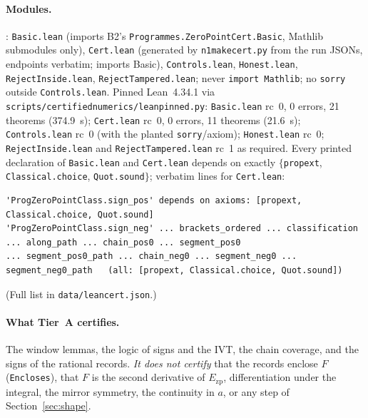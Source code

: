 \documentclass[10pt]{article}
\newcommand{\lean}[1]{\texttt{#1}}
\renewcommand{\_}{\textunderscore\penalty0\hspace{0pt}}
\begin{document}
\paragraph{Modules.} : \texttt{Basic.lean} (imports B2's \lean{Programmes.ZeroPointCert.Basic}, Mathlib submodules only), \texttt{Cert.lean} (generated by \texttt{n1\_make\_cert.py} from the run JSONs, endpoints verbatim; imports Basic), \texttt{Controls.lean}, \texttt{Honest.lean}, \texttt{RejectInside.lean}, \texttt{RejectTampered.lean}; never \lean{import Mathlib}; no \lean{sorry} outside \texttt{Controls.lean}.
Pinned Lean~4.34.1 via \texttt{scripts/certified\_numerics/lean\_pinned.py}: \texttt{Basic.lean} rc~0, 0 errors, 21 theorems (374.9~s); \texttt{Cert.lean} rc~0, 0 errors, 11 theorems (21.6~s); \texttt{Controls.lean} rc~0 (with the planted \lean{sorry}/axiom); \texttt{Honest.lean} rc~0; \texttt{RejectInside.lean} and \texttt{RejectTampered.lean} rc~1 as required.
Every printed declaration of \texttt{Basic.lean} and \texttt{Cert.lean} depends on exactly $\{$\lean{propext}, \lean{Classical.choice}, \lean{Quot.sound}$\}$; verbatim lines for \texttt{Cert.lean}:
\begin{lstlisting}[basicstyle=\ttfamily\scriptsize]
'ProgZeroPointClass.sign_pos' depends on axioms: [propext, Classical.choice, Quot.sound]
'ProgZeroPointClass.sign_neg' ... brackets_ordered ... classification ... along_path ... chain_pos0 ... segment_pos0
... segment_pos0_path ... chain_neg0 ... segment_neg0 ... segment_neg0_path   (all: [propext, Classical.choice, Quot.sound])
\end{lstlisting}
(Full list in \texttt{data/lean\_cert.json}.)
\paragraph{What Tier~A certifies.} The window lemmas, the logic of signs and the IVT, the chain coverage, and the signs of the rational records. \emph{It does not certify} that the records enclose $F$ (\lean{Encloses}), that $F$ is the second derivative of $E_{\mathrm{zp}}$, differentiation under the integral, the mirror symmetry, the continuity in $a$, or any step of Section~\ref{sec:shape}.
\end{document}
